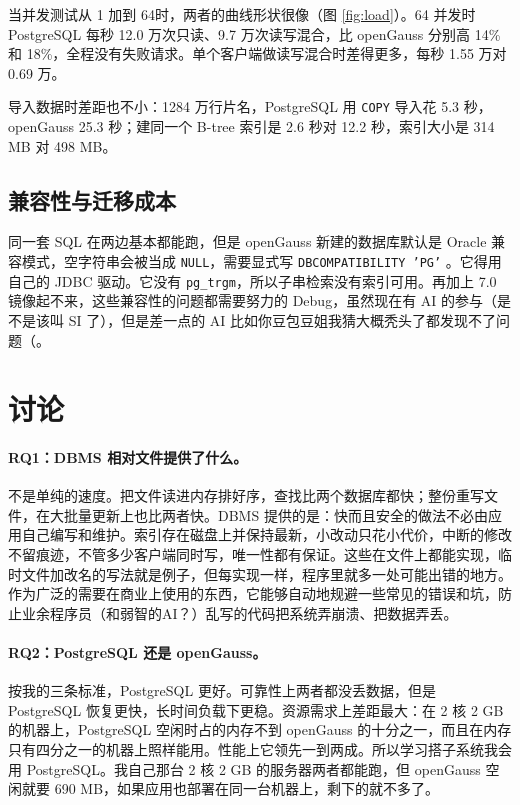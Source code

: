 \documentclass[UTF8,a4paper,zihao=5,fontset=none]{ctexart}
\newcommand{\code}[1]{\texttt{#1}}
\begin{document}
当并发测试从 1 加到 64时，两者的曲线形状很像（图 \ref{fig:load}）。64 并发时 PostgreSQL 每秒 12.0 万次只读、9.7 万次读写混合，比 openGauss 分别高 14\% 和 18\%，全程没有失败请求。单个客户端做读写混合时差得更多，每秒 1.55 万对 0.69 万。

导入数据时差距也不小：1284 万行片名，PostgreSQL 用 \code{COPY} 导入花 5.3 秒，openGauss 25.3 秒；建同一个 B-tree 索引是 2.6 秒对 12.2 秒，索引大小是 314 MB 对 498 MB。

\subsection{兼容性与迁移成本}

同一套 SQL 在两边基本都能跑，但是 openGauss 新建的数据库默认是 Oracle 兼容模式，空字符串会被当成 \code{NULL}，需要显式写 \code{DBCOMPATIBILITY 'PG'} \cite{ogdocs}。它得用自己的 JDBC 驱动。它没有 \code{pg\_trgm}，所以子串检索没有索引可用。再加上 7.0 镜像起不来，这些兼容性的问题都需要努力的 Debug，虽然现在有 AI 的参与（是不是该叫 SI 了），但是差一点的 AI 比如你豆包豆姐我猜大概秃头了都发现不了问题（。

\section{讨论}\label{sec:discussion}

\paragraph{RQ1：DBMS 相对文件提供了什么。}不是单纯的速度。把文件读进内存排好序，查找比两个数据库都快；整份重写文件，在大批量更新上也比两者快。DBMS 提供的是：快而且安全的做法不必由应用自己编写和维护。索引存在磁盘上并保持最新，小改动只花小代价，中断的修改不留痕迹，不管多少客户端同时写，唯一性都有保证。这些在文件上都能实现，临时文件加改名的写法就是例子，但每实现一样，程序里就多一处可能出错的地方。作为广泛的需要在商业上使用的东西，它能够自动地规避一些常见的错误和坑，防止业余程序员（和弱智的AI？）乱写的代码把系统弄崩溃、把数据弄丢。

\paragraph{RQ2：PostgreSQL 还是 openGauss。}按我的三条标准，PostgreSQL 更好。可靠性上两者都没丢数据，但是 PostgreSQL 恢复更快，长时间负载下更稳。资源需求上差距最大：在 2 核 2 GB 的机器上，PostgreSQL 空闲时占的内存不到 openGauss 的十分之一，而且在内存只有四分之一的机器上照样能用。性能上它领先一到两成。所以学习搭子系统我会用 PostgreSQL。我自己那台 2 核 2 GB 的服务器两者都能跑，但 openGauss 空闲就要 690 MB，如果应用也部署在同一台机器上，剩下的就不多了。
\end{document}
